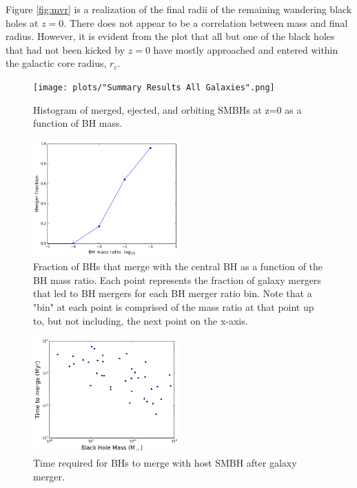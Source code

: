 \documentclass[english, apj]{emulateapj}
\begin{document}
Figure \ref{fig:mvr} is a realization of the final radii of the remaining wandering black holes at $z=0$.  There does not appear to be a correlation between mass and final radius.  However, it is evident from the plot that all but one of the black holes that had not been kicked by $z=0$ have mostly approached and entered within the galactic core radius, $r_c$.

\begin{figure}[ht]
\begin{center}
\texttt{[image: plots/"Summary Results All Galaxies".png]}
\caption{Histogram of merged, ejected, and orbiting SMBHs at z=0 as a function of BH mass.}
\label{fig:meosmbh}
\end{center}
\end{figure}

\begin{figure}[ht]
\begin{center}
\includegraphics[width=0.5\textwidth]{plots/q_merger_fraction.png}
\caption{Fraction of BHs that merge with the central BH as a function of the BH mass ratio.  Each point represents the fraction of galaxy mergers that led to BH mergers for each BH merger ratio bin.  Note that a "bin" at each point is comprised of the mass ratio at that point up to, but not including, the next point on the x-axis.}
\label{fig:q_merge_fraction}
\end{center}
\end{figure}

\begin{figure}[ht]
\begin{center}
\includegraphics[width=0.5\textwidth]{plots/time_to_merge.png}
\caption{Time required for BHs to merge with host SMBH after galaxy merger.}
\label{fig:time_to_merge}
\end{center}
\end{figure}
\end{document}
